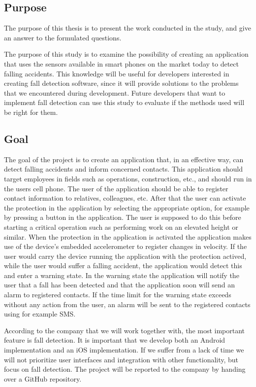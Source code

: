 \documentclass[12pt, a4paper, onecolumn]{article}
\begin{document}
		\subsection{Purpose}
		
		The purpose of this thesis is to present the work conducted in the study, and give an answer to the formulated questions.
		
		The purpose of this study is to examine the possibility of creating an application that uses the sensors available in smart phones on the market today to detect falling accidents. This knowledge will be useful for developers interested in creating fall detection software, since it will provide solutions to the problems that we encountered during development. Future developers that want to implement fall detection can use this study to evaluate if the methods used will be right for them.
		
		\subsection{Goal}
		
		The goal of the project is to create an application that, in an effective way, can detect falling accidents and inform concerned contacts. This application should target employees in fields such as operations, construction, etc., and should run in the users cell phone. The user of the application should be able to register contact information to relatives, colleagues, etc. After that the user can activate the protection in the application by selecting the appropriate option, for example by pressing a button in the application. The user is supposed to do this before starting a critical operation such as performing work on an elevated height or similar. When the protection in the application is activated the application makes use of the device's embedded accelerometer to register changes in velocity. If the user would carry the device running the application with the protection actived, while the user would suffer a falling accident, the application would detect this and enter a warning state. In the warning state the application will notify the user that a fall has been detected and that the application soon will send an alarm to registered contacts. If the time limit for the warning state exceeds without any action from the user, an alarm will be sent to the registered contacts using for example SMS.
		
		According to the company that we will work together with, the most important feature is fall detection. It is important that we develop both an Android implementation and an iOS implementation. If we suffer from a lack of time we will not prioritize user interfaces and integration with other functionality, but focus on fall detection. The project will be reported to the company by handing over a GitHub repository.
		
\end{document}
